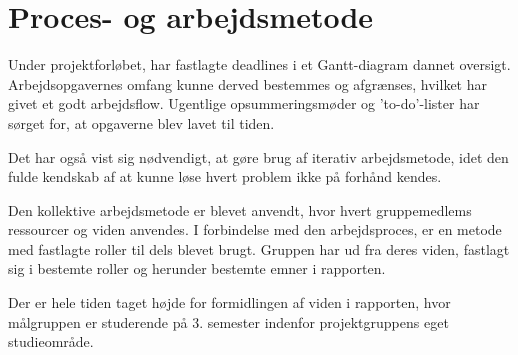 \section{Proces- og arbejdsmetode}
Under projektforløbet, har fastlagte deadlines i et Gantt-diagram dannet oversigt. 
Arbejdsopgavernes omfang kunne derved bestemmes og afgrænses, hvilket har givet et godt arbejdsflow.
Ugentlige opsummeringsmøder og 'to-do'-lister har sørget for, at opgaverne blev lavet til tiden.

Det har også vist sig nødvendigt, at gøre brug af iterativ arbejdsmetode, idet den fulde kendskab af at kunne løse hvert problem ikke på forhånd kendes.

Den kollektive arbejdsmetode er blevet anvendt, hvor hvert gruppemedlems ressourcer og viden anvendes.
I forbindelse med den arbejdsproces, er en metode med fastlagte roller til dels blevet brugt.
Gruppen har ud fra deres viden, fastlagt sig i bestemte roller og herunder bestemte emner i rapporten.

Der er hele tiden taget højde for formidlingen af viden i rapporten, hvor målgruppen er studerende på 3. semester indenfor projektgruppens eget studieområde.
